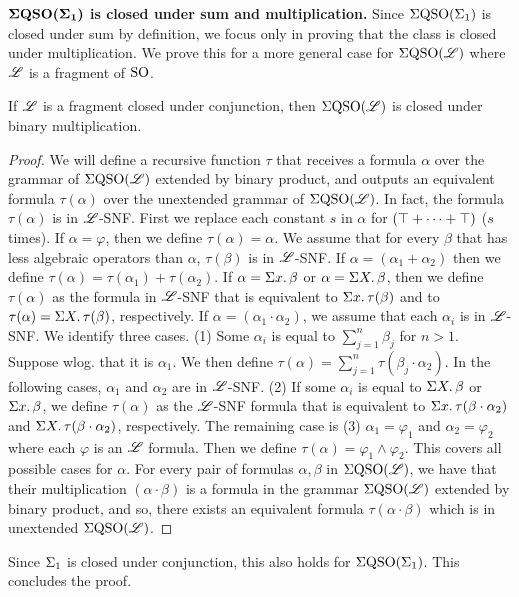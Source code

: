 \vspace{1em}
$\boldsymbol{\Sigma{\rm QSO}(\Sigma_{1})}$ {\bf is closed under sum and multiplication.} Since $\Sigma{\rm QSO}(\Sigma_{1})$ is closed under sum by definition, we focus only in proving that the class is closed under multiplication. We prove this for a more general case for $\Sigma{\rm QSO}(\mathscr{L})$ where $\mathscr{L}$ is a fragment of ${\rm SO}$.

\begin{lemma} \label{conj-mult}
If $\mathscr{L}$ is a fragment closed under conjunction, then $\Sigma{\rm QSO}(\mathscr{L})$ is closed under binary multiplication.
\end{lemma}
\begin{proof}
We will define a recursive function $\tau$ that receives a formula $\alpha$ over the grammar of $\Sigma{\rm QSO}(\mathscr{L})$ extended by binary product, and outputs an equivalent formula $\tau(\alpha)$ over the unextended grammar of $\Sigma{\rm QSO}(\mathscr{L})$. In fact, the formula $\tau(\alpha)$ is in $\mathscr{L}$-SNF. First we replace each constant $s$ in $\alpha$ for $(\top + \cdots + \top)$ ($s$ times). If $\alpha = \varphi$, then we define $\tau(\alpha) = \alpha$. We assume that for every $\beta$ that has less algebraic operators than $\alpha$, $\tau(\beta)$ is in $\mathscr{L}$-SNF. If $\alpha = (\alpha_1 + \alpha_2)$ then we define $\tau(\alpha) = \tau(\alpha_1) + \tau(\alpha_2)$. If $\alpha = \Sigma{x}.\,\beta$ or $\alpha = \Sigma{X}.\,\beta$, then we define $\tau(\alpha)$ as the formula in $\mathscr{L}$-SNF that is equivalent to $\Sigma{x}.\,\tau(\beta)$ and to $\tau(\alpha) = \Sigma{X}.\,\tau(\beta)$, respectively. If $\alpha = (\alpha_1 \cdot \alpha_2)$, we assume that each $\alpha_i$ is in $\mathscr{L}$-SNF. We identify three cases. (1) Some $\alpha_i$ is equal to $\sum_{j = 1}^n\beta_j$ for $n > 1$. Suppose wlog. that it is $\alpha_1$. We then define $\tau(\alpha) = \sum_{j = 1}^n\tau(\beta_j\cdot\alpha_2)$. In the following cases, $\alpha_1$ and $\alpha_2$ are in $\mathscr{L}$-SNF. (2) If some $\alpha_i$ is equal to $\Sigma{X}.\,\beta$ or $\Sigma{x}.\,\beta$, we define $\tau(\alpha)$ as the $\mathscr{L}$-SNF formula that is equivalent to $\Sigma{x}.\,\tau(\beta\cdot\alpha_2)$ and $\Sigma{X}.\,\tau(\beta\cdot\alpha_2)$, respectively. The remaining case is (3) $\alpha_1 = \varphi_1$ and $\alpha_2 = \varphi_2$ where each $\varphi$ is an $\mathscr{L}$ formula. Then we define $\tau(\alpha) = \varphi_1 \wedge \varphi_2$. This covers all possible cases for $\alpha$. For every pair of formulas $\alpha,\beta$ in $\Sigma{\rm QSO}(\mathscr{L})$, we have that their multiplication $(\alpha\cdot\beta)$ is a formula in the grammar $\Sigma{\rm QSO}(\mathscr{L})$ extended by binary product, and so, there exists an equivalent formula $\tau(\alpha\cdot\beta)$ which is in unextended $\Sigma{\rm QSO}(\mathscr{L})$.
\end{proof}
Since $\Sigma_{1}$ is closed under conjunction, this also holds for $\Sigma{\rm QSO}(\Sigma_{1})$. This concludes the proof.











